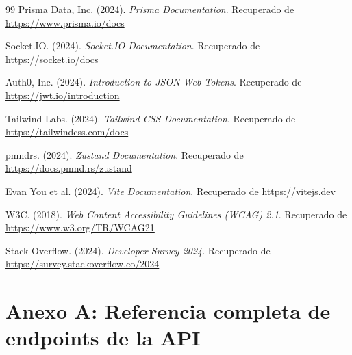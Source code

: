 \documentclass[a4paper]{report}
\begin{document}
\begin{thebibliography}{99}
Prisma Data, Inc. (2024). \textit{Prisma Documentation}. Recuperado de \url{https://www.prisma.io/docs}

Socket.IO. (2024). \textit{Socket.IO Documentation}. Recuperado de \url{https://socket.io/docs}

Auth0, Inc. (2024). \textit{Introduction to JSON Web Tokens}. Recuperado de \url{https://jwt.io/introduction}

Tailwind Labs. (2024). \textit{Tailwind CSS Documentation}. Recuperado de \url{https://tailwindcss.com/docs}

pmndrs. (2024). \textit{Zustand Documentation}. Recuperado de \url{https://docs.pmnd.rs/zustand}

Evan You et al. (2024). \textit{Vite Documentation}. Recuperado de \url{https://vitejs.dev}

W3C. (2018). \textit{Web Content Accessibility Guidelines (WCAG) 2.1}. Recuperado de \url{https://www.w3.org/TR/WCAG21}

Stack Overflow. (2024). \textit{Developer Survey 2024}. Recuperado de \url{https://survey.stackoverflow.co/2024}

\end{thebibliography}

\appendix
\chapter{Anexo A: Referencia completa de endpoints de la API}
\end{document}
